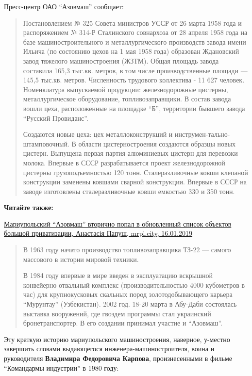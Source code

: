 Пресс-центр ОАО \enquote{Азовмаш} сообщает: 

\begin{quote}
	
Постановлением № 325 Совета министров УССР от 26 марта 1958 года и
распоряжением № 314-Р Сталинского совнархоза от 28 апреля 1958 года на
базе машиностроительного и металлургического производств завода имени
Ильича (по состоянию цехов на 1 мая 1958 года) образован Ждановский
завод тяжелого машиностроения (ЖЗТМ). Общая площадь завода составила
165,3 тыс.кв. метров, в том числе производственные площади — 145,5
тыс.кв. метров. Численность трудового коллектива - 11 627 человек.
Номенклатура выпускаемой продукции: железнодорожные цистерны,
металлургическое оборудование, топливозаправщики. В состав завода вошли
цеха, расположенные на площадке \enquote{Б}, территории бывшего завода \enquote{Русский
Провиданс}. 

Создаются новые цеха: цех металлоконструкций и инструмен\hyp{}тально-штамповочный. В
области цистерностроения создаются образцы новых цистерн. Выпущена первая
партия алюминиевых цистерн для перевозки молока. Впервые в СССР разрабатывается
проект железнодорожной цистерны грузоподъемностью 120 тонн. Сталеразливочные
ковши клепаной конструкции заменены ковшами сварной конструкции. Впервые в СССР
на заводе изготовлены сталеразливочные ковши емкостью 330 и 350 тонн.

\end{quote}

\textbf{Читайте также:} 

\href{https://mrpl.city/news/view/mariupolskij-azovmash-vtorichno-popal-v-obnovlennyj-spisok-obektov-bolshoj-privatizatsii}{%
Мариупольский \enquote{Азовмаш} вторично попал в обновленный список объектов большой приватизации, Анастасія Папуш, mrpl.city, 16.01.2019}

\begin{quote}
В 1963 году начато производство топливозаправщика ТЗ-22 — самого массового в
истории мировой техники.

В 1984 году впервые в мире введен в эксплуатацию вскрышной конвейерно-отвальный
комплекс (производительностью 4000 кубометров в час) для крупнокусковых
скальных пород золотодобывающего карьера \enquote{Мурунтау} (Узбекистан). 2002 год.
18-20 марта в Абу-Даби состоялась выставка вооружений, где гвоздем программы
стал украинский бронетранспортер. В его создании принимал участие и \enquote{Азовмаш}.
\end{quote}

Эту краткую историю мариупольского машиностроения, наверное, у\hyp{}местно завершить
словами выдающегося инженера-машиностроителя, воина и руководителя \textbf{Владимира
Федоровича Карпова}, произнесенными в фильме \enquote{Командармы индустрии} в 1980 году:


